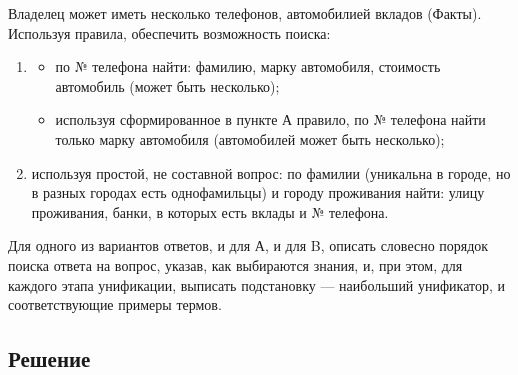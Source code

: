 \documentclass[12pt]{report}
\begin{document}
Владелец может иметь несколько телефонов, автомобилией вкладов (Факты). Используя правила, обеспечить возможность поиска:

\begin{enumerate}
	\item \begin{itemize}
		\item по № телефона найти: фамилию, марку автомобиля, стоимость автомобиль (может быть несколько);
		\item используя сформированное в пункте А правило, по № телефона найти только марку автомобиля (автомобилей может быть несколько);
	\end{itemize}
	\item используя простой, не составной вопрос: по фамилии (уникальна в городе, но в разных городах есть однофамильцы) и городу проживания найти: улицу проживания, банки, в которых есть вклады и № телефона.
\end{enumerate}

Для одного из вариантов ответов, и для А, и для B, описать словесно порядок поиска ответа на вопрос, указав, как выбираются знания, и, при этом, для каждого этапа унификации, выписать подстановку — наибольший унификатор, и соответствующие примеры термов.

\subsection*{Решение}
\end{document}
